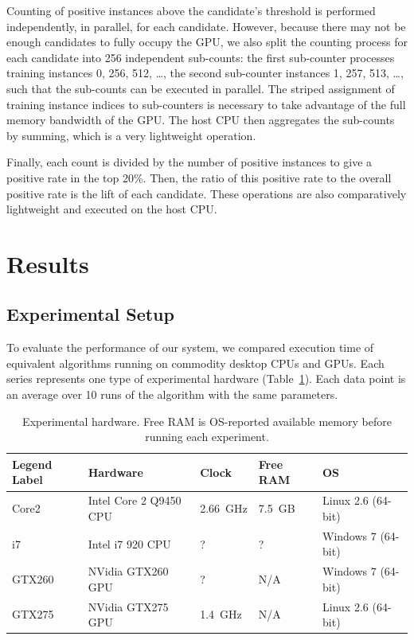 \documentclass[11pt]{article}       %
\begin{document}
Counting of positive instances above the candidate's threshold is performed independently, in parallel, for each candidate. However, because there may not be enough candidates to fully occupy the GPU, we also split the counting process for each candidate into 256 independent sub-counts: the first sub-counter processes training instances 0, 256, 512, \ldots, the second sub-counter instances 1, 257, 513, \ldots, such that the sub-counts can be executed in parallel. The striped assignment of training instance indices to sub-counters is necessary to take advantage of the full memory bandwidth of the GPU. The host CPU then aggregates the sub-counts by summing, which is a very lightweight operation.

Finally, each count is divided by the number of positive instances to give a positive rate in the top 20\%. Then, the ratio of this positive rate to the overall positive rate is the lift of each candidate. These operations are also comparatively lightweight and executed on the host CPU.

\section{Results} \label{results}

\subsection{Experimental Setup} \label{experiment}
To evaluate the performance of our system, we compared execution time of equivalent algorithms running on commodity desktop CPUs and GPUs. Each series represents one type of experimental hardware (Table~\ref{tab:experimental-hardware}). Each data point is an average over 10 runs of the algorithm with the same parameters.

\begin{table}[h]
	\centering
	\begin{tabular}{lllll}
	\textbf{Legend Label} & \textbf{Hardware} & \textbf{Clock} & \textbf{Free RAM} & \textbf{OS} \\
	\hline
	Core2  & Intel Core 2 Q9450 CPU & 2.66~GHz & 7.5~GB & Linux 2.6 (64-bit) \\
	i7     & Intel i7 920 CPU       & ?        & ?      & Windows 7 (64-bit) \\
	GTX260 & NVidia GTX260 GPU      & ?        & N/A    & Windows 7 (64-bit) \\
	GTX275 & NVidia GTX275 GPU      & 1.4~GHz  & N/A    & Linux 2.6 (64-bit) \\
	\hline
	\end{tabular}
	\caption{Experimental hardware. Free RAM is OS-reported available memory before running each experiment.}
	\label{tab:experimental-hardware}
\end{table}
\end{document}

